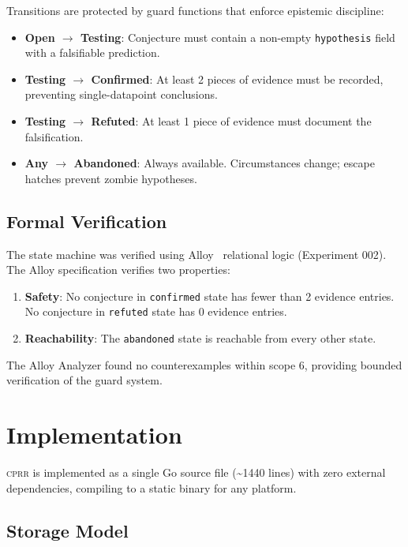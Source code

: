 \documentclass[sigconf,screen]{acmart}
\begin{document}
Transitions are protected by guard functions that enforce epistemic discipline:

\begin{itemize}
\item \textbf{Open $\rightarrow$ Testing}: Conjecture must contain a non-empty \texttt{hypothesis} field with a falsifiable prediction.
\item \textbf{Testing $\rightarrow$ Confirmed}: At least 2 pieces of evidence must be recorded, preventing single-datapoint conclusions.
\item \textbf{Testing $\rightarrow$ Refuted}: At least 1 piece of evidence must document the falsification.
\item \textbf{Any $\rightarrow$ Abandoned}: Always available. Circumstances change; escape hatches prevent zombie hypotheses.
\end{itemize}

\subsection{Formal Verification}

The state machine was verified using Alloy~\cite{jackson2012alloy} relational logic (Experiment 002). The Alloy specification verifies two properties:

\begin{enumerate}
\item \textbf{Safety}: No conjecture in \texttt{confirmed} state has fewer than 2 evidence entries. No conjecture in \texttt{refuted} state has 0 evidence entries.
\item \textbf{Reachability}: The \texttt{abandoned} state is reachable from every other state.
\end{enumerate}

The Alloy Analyzer found no counterexamples within scope 6, providing bounded verification of the guard system.

\section{Implementation}\label{sec:implementation}

\textsc{cprr} is implemented as a single Go source file (\textasciitilde1440 lines) with zero external dependencies, compiling to a static binary for any platform.

\subsection{Storage Model}
\end{document}
